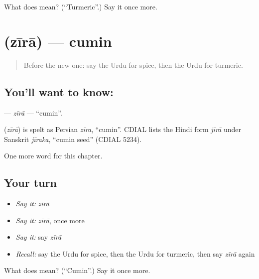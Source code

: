 \begin{tcolorbox}[breakable,colback=teal!4,colframe=teal!35!black,title={Before you move on}]
What does  mean? (\textquotedblleft{}Turmeric\textquotedblright{}.) Say it once more.
\end{tcolorbox}
\section[\texorpdfstring{\ur{زیرہ} (zīrā)}{زیرہ (zīrā)}]{ (zīrā) — cumin}

\label{lesson:UR-C199-zira}



\begin{quote}
Before the new one: say the Urdu for spice, then the Urdu for turmeric.
\end{quote}

\subsection*{You'll want to know: }
\textbf{} — \emph{zīrā} — \textquotedblleft{}cumin\textquotedblright{}.

\begin{cousinweb}
\textbf{} (\emph{zīrā}) is spelt as Persian \emph{zīra}, \textquotedblleft{}cumin\textquotedblright{}. CDIAL lists the Hindi form \emph{jīrā} under Sanskrit \emph{jīraka}, \textquotedblleft{}cumin seed\textquotedblright{} (CDIAL 5234).
\end{cousinweb}

\begin{grammarlens}[title={What you've built}]
One more word for this chapter.
\end{grammarlens}

\subsection*{Your turn}
\begin{itemize}
\raggedright
  \item \emph{Say it:} \emph{zīrā}
  \item \emph{Say it:} \emph{zīrā}, once more
  \item \emph{Say it:} say \emph{zīrā}
  \item \emph{Recall:} say the Urdu for spice, then the Urdu for turmeric, then say \emph{zīrā} again
\end{itemize}

\begin{tcolorbox}[breakable,colback=teal!4,colframe=teal!35!black,title={Before you move on}]
What does  mean? (\textquotedblleft{}Cumin\textquotedblright{}.) Say it once more.
\end{tcolorbox}
